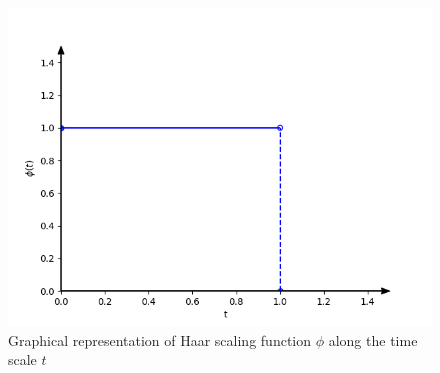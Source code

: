 \documentclass[../Main/thesis.tex]{subfiles}
\begin{document}
\begin{figure}[H] %
   \centering
   \includegraphics[width=5in]{../fig/haar-phi.png} 
   \caption{Graphical representation of Haar scaling function $\phi$ along the time scale $t$}
   \label{fig:haar-phi}
\end{figure}
\end{document}
